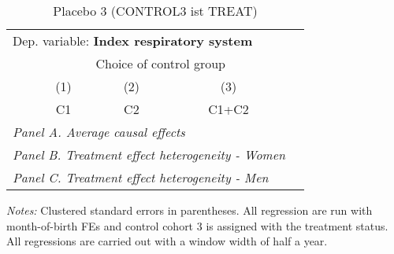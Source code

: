  \begin{table}[H] \centering \begin{threeparttable} \caption{Placebo 3 (CONTROL3 ist TREAT) } {\def\sym#1{\ifmmode^{#1}\else\(^{#1}\)\fi} \begin{tabular}{l*{4}{c}} \toprule \multicolumn{4}{l}{Dep. variable: \textbf{Index respiratory system}} \\ & \multicolumn{3}{c}{Choice of control group} \\ \cmidrule(lr){2-4}
            &\multicolumn{1}{c}{(1)}&\multicolumn{1}{c}{(2)}&\multicolumn{1}{c}{(3)}\\
            &\multicolumn{1}{c}{C1}&\multicolumn{1}{c}{C2}&\multicolumn{1}{c}{C1+C2}\\
\midrule
 \multicolumn{4}{l}{\emph{Panel A. Average causal effects}} \\      \midrule\multicolumn{4}{l}{\emph{Panel B. Treatment effect heterogeneity - Women}} \\      \midrule\multicolumn{4}{l}{\emph{Panel C. Treatment effect heterogeneity - Men}} \\      
\bottomrule \end{tabular} } \begin{tablenotes} \item \scriptsize \emph{Notes:} Clustered standard errors in parentheses. All regression are run with month-of-birth FEs and control cohort 3 is assigned with the treatment status. All regressions are carried out with a window width of half a year. \end{tablenotes} \end{threeparttable} \end{table} 
